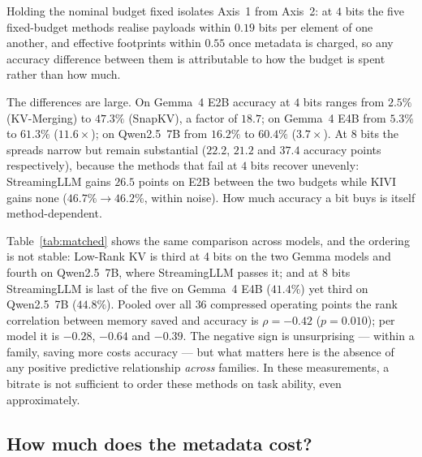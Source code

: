 \documentclass[sigplan,10pt,anonymous,review,nonacm]{acmart}
\newcommand{\beff}{b_{\text{eff}}}
\begin{document}
Holding the nominal budget fixed isolates Axis~1 from Axis~2: at $4$ bits the
five fixed-budget methods realise payloads within $0.19$ bits per element of
one another, and effective footprints within $0.55$ once metadata is charged,
so any accuracy difference between them is attributable to how the budget is
spent rather than how much.

The differences are large. On Gemma~4 E2B accuracy at $4$ bits ranges from
$2.5\%$ (KV-Merging) to $47.3\%$ (SnapKV), a factor of $18.7$; on Gemma~4 E4B
from $5.3\%$ to $61.3\%$ ($11.6\times$); on Qwen2.5~7B from $16.2\%$ to
$60.4\%$ ($3.7\times$). At $8$ bits the spreads narrow but remain substantial
($22.2$, $21.2$ and $37.4$ accuracy points respectively), because the methods
that fail at $4$ bits recover unevenly: StreamingLLM gains $26.5$ points on
E2B between the two budgets while KIVI gains none ($46.7\% \to 46.2\%$, within
noise). How much accuracy a bit buys is itself method-dependent.

Table~\ref{tab:matched} shows the same comparison across models, and the
ordering is not stable: Low-Rank KV is third at 4 bits on the two Gemma models
and fourth on Qwen2.5~7B, where StreamingLLM passes it; and at 8 bits
StreamingLLM is last of the five on Gemma~4 E4B ($41.4\%$) yet third on
Qwen2.5~7B ($44.8\%$). Pooled over all $36$ compressed
operating points the rank correlation between memory saved and accuracy is
$\rho = {-}0.42$ ($p = 0.010$); per model it is ${-}0.28$, ${-}0.64$ and
${-}0.39$. The negative sign is unsurprising --- within a family, saving more
costs accuracy --- but what matters here is the absence of any positive
predictive relationship \emph{across} families. In these measurements, a
bitrate is not sufficient to order these methods on task ability, even
approximately.

\begin{table}[t]
\centering
\small
\setlength{\tabcolsep}{4.0pt}
\caption{\textbf{Identical budget, three models, and no stable ordering.}
Accuracy per model at each controlled nominal budget, with the mean realised
$\beff$, mean paired TTFT inflation and mean hardware multiplier over the
three models. Within a block every method holds the same nominal budget, so
accuracy differences are attributable to how the budget is spent, and the
serving columns to how the transform is implemented.}
\label{tab:matched}

\end{table}

\subsection{How much does the metadata cost?}
\label{sec:res_metadata}
\end{document}
